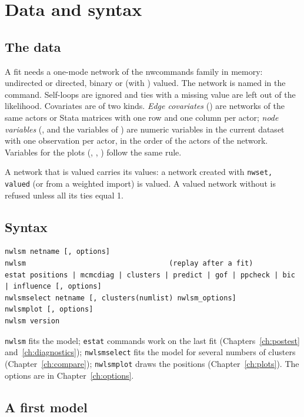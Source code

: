 \chapter{Data and syntax}\label{ch:start}

\section{The data}\label{sec:data}

A fit needs a one-mode network of the nwcommands family in memory: undirected or directed, binary or (with ) valued. The network is named in the command. Self-loops are ignored and ties with a missing value are left out of the likelihood. Covariates are of two kinds. \emph{Edge covariates} () are networks of the same actors or Stata matrices with one row and one column per actor; \emph{node variables} (, and the variables of ) are numeric variables in the current dataset with one observation per actor, in the order of the actors of the network. Variables for the plots (, , ) follow the same rule.

A network that is valued carries its values: a network created with \texttt{nwset, valued} (or from a weighted import) is valued. A valued network without  is refused unless all its ties equal 1.

\section{Syntax}\label{sec:syntax}

\begin{lstlisting}
nwlsm netname [, options]
nwlsm                                  (replay after a fit)
estat positions | mcmcdiag | clusters | predict | gof | ppcheck | bic | influence [, options]
nwlsmselect netname [, clusters(numlist) nwlsm_options]
nwlsmplot [, options]
nwlsm version
\end{lstlisting}

\texttt{nwlsm} fits the model; \texttt{estat} commands work on the last fit (Chapters~\ref{ch:postest} and~\ref{ch:diagnostics}); \texttt{nwlsmselect} fits the model for several numbers of clusters (Chapter~\ref{ch:compare}); \texttt{nwlsmplot} draws the positions (Chapter~\ref{ch:plots}). The options are in Chapter~\ref{ch:options}.

\section{A first model}\label{sec:first}

